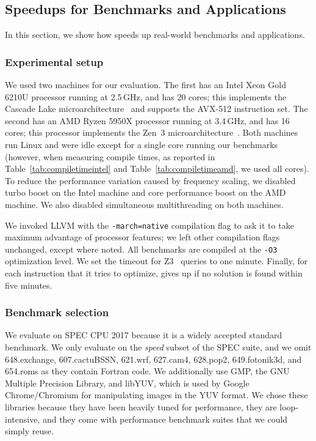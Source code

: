 \subsection{Speedups for Benchmarks and Applications}

In this section, we show how \minotaur{} speeds up real-world benchmarks
and applications.

\subsubsection{Experimental setup}
%
We used two machines for our evaluation.
%
The first has an Intel Xeon Gold 6210U processor running at 2.5\,GHz,
and has 20 cores; this implements the Cascade Lake
microarchitecture~\cite{cascadelake} and supports the AVX-512
instruction set.
%
The second has an AMD Ryzen 5950X processor running at 3.4\,GHz, and
has 16 cores; this processor implements the Zen~3
microarchitecture~\cite{zen3}.
%
Both machines run Linux and were idle except for a single core running
our benchmarks (however, when measuring compile times, as reported in
Table~\ref{tab:compiletimeintel} and Table~\ref{tab:compiletimeamd}, we used all cores).
%
To reduce the performance variation caused by frequency scaling, we
disabled turbo boost on the Intel machine and core performance
boost on the AMD machine.
%
We also disabled simultaneous multithreading on both machines.


We invoked LLVM with the \texttt{-march=native} compilation flag to
ask it to take maximum advantage of processor features; we left other
compilation flags unchanged, except where noted.
%
All benchmarks are compiled at the \texttt{-O3} optimization level.
%
We set the timeout for Z3~\cite{z3} queries to one minute.
%
Finally, for each instruction that it tries to optimize, \minotaur{} gives
up if no solution is found within five minutes.


\subsubsection{Benchmark selection}
%
We evaluate on SPEC CPU 2017 because it is a widely accepted standard
benchmark.
%
We only evaluate on the \emph{speed} subset of the SPEC suite, and we
omit 648.exchange, 607.cactuBSSN, 621.wrf, 627.cam4, 628.pop2,
649.fotonik3d, and 654.roms as they contain Fortran code.
%
We additionally use GMP, the GNU Multiple Precision Library, and
libYUV, which is used by Google Chrome/Chromium for manipulating
images in the YUV format.
%
We chose these libraries because they have been heavily tuned for
performance, they are loop-intensive, and they come with performance
benchmark suites that we could simply reuse.


